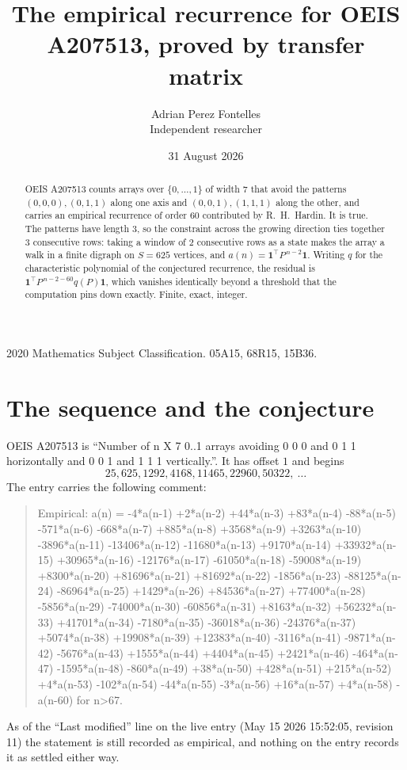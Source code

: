 \documentclass[11pt,a4paper]{article}
\title{The empirical recurrence for OEIS A207513, proved by transfer matrix}
\author{Adrian Perez Fontelles\\ \small Independent researcher}
\date{31 August 2026}
\theoremstyle{plain}
\theoremstyle{definition}
\begin{document}
\maketitle

\begin{abstract}
OEIS A207513 counts arrays over $\{0,\dots,1\}$ of width $7$ that avoid the patterns
$(0,0,0), (0,1,1)$ along one axis and $(0,0,1), (1,1,1)$ along the other, and carries an empirical recurrence of
order $60$ contributed by R.~H.~Hardin. It is true. The patterns have length $3$, so
the constraint across the growing direction ties together $3$ consecutive rows: taking a
window of $2$ consecutive rows as a state makes the array a walk in a finite digraph
on $S=625$ vertices, and $a(n)=\mathbf{1}^{\!\top}P^{\,n-2}\mathbf{1}$. Writing $q$
for the characteristic polynomial of the conjectured recurrence, the residual is
$\mathbf{1}^{\!\top}P^{\,n-2-60}q(P)\mathbf{1}$, which vanishes identically
beyond a threshold that the computation pins down exactly. Finite, exact, integer.
\end{abstract}

\noindent\small 2020 Mathematics Subject Classification. 05A15, 68R15, 15B36.\normalsize

\section{The sequence and the conjecture}

OEIS A207513 is ``Number of n X 7 0..1 arrays avoiding 0 0 0 and 0 1 1 horizontally and 0 0 1 and 1 1 1 vertically.''. It has offset
$1$ and begins
\[
25, 625, 1292, 4168, 11465, 22960, 50322,\ \dots
\]
The entry carries the following comment:
\begin{quote}\small
Empirical: a(n) = -4*a(n-1) +2*a(n-2) +44*a(n-3) +83*a(n-4) -88*a(n-5) -571*a(n-6) -668*a(n-7) +885*a(n-8) +3568*a(n-9) +3263*a(n-10) -3896*a(n-11) -13406*a(n-12) -11680*a(n-13) +9170*a(n-14) +33932*a(n-15) +30965*a(n-16) -12176*a(n-17) -61050*a(n-18) -59008*a(n-19) +8300*a(n-20) +81696*a(n-21) +81692*a(n-22) -1856*a(n-23) -88125*a(n-24) -86964*a(n-25) +1429*a(n-26) +84536*a(n-27) +77400*a(n-28) -5856*a(n-29) -74000*a(n-30) -60856*a(n-31) +8163*a(n-32) +56232*a(n-33) +41701*a(n-34) -7180*a(n-35) -36018*a(n-36) -24376*a(n-37) +5074*a(n-38) +19908*a(n-39) +12383*a(n-40) -3116*a(n-41) -9871*a(n-42) -5676*a(n-43) +1555*a(n-44) +4404*a(n-45) +2421*a(n-46) -464*a(n-47) -1595*a(n-48) -860*a(n-49) +38*a(n-50) +428*a(n-51) +215*a(n-52) +4*a(n-53) -102*a(n-54) -44*a(n-55) -3*a(n-56) +16*a(n-57) +4*a(n-58) -a(n-60) for n>67.
\end{quote}
As of the ``Last modified'' line on the live entry (May 15 2026 15:52:05, revision
11) the statement is still recorded as empirical, and nothing on the entry
records it as settled either way.
\end{document}
